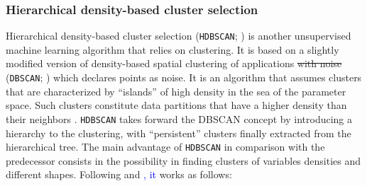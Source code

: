 \documentclass[fleqn,usenatbib]{mnras}
\newcommand{\rlopes}[1]{\textcolor{blue}{#1}}
\begin{document}



\subsubsection{Hierarchical density-based cluster selection}
\label{sec:hdbscan}

Hierarchical density-based cluster selection (\texttt{HDBSCAN}; \citealp{Campello:2013})
is another unsupervised machine learning algorithm that relies on clustering. It is based on a slightly
modified version of density-based spatial
clustering of applications \sout{with noise} (\texttt{DBSCAN}; \citealp{Ester:1996}) which
declares points as noise. It is an algorithm that assumes clusters that are characterized
by ``islands'' of high density in the sea of the parameter space. Such clusters constitute
data partitions that have a higher density
than their neighbors  \citep{Ntwaetsile:2021}. \texttt{HDBSCAN} takes forward the
DBSCAN concept by introducing a hierarchy to the clustering, with ``persistent''
clusters finally extracted from the hierarchical tree. The main advantage of
\texttt{HDBSCAN} in comparison with the predecessor consists in the possibility in finding
clusters of variables densities and different shapes. Following \citet{Malzer:2021}
and \citet{Ntwaetsile:2021}\rlopes{, it} works as follows:
\end{document}
